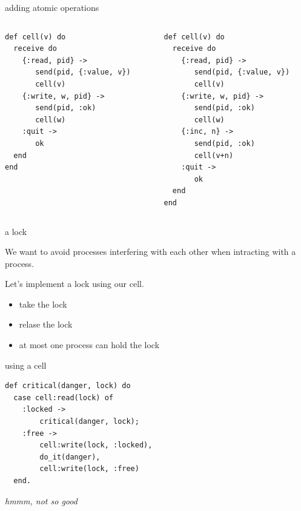 \begin{frame}[fragile]{adding atomic operations}

\begin{columns}
 \begin{column}{0.5\linewidth}
\begin{verbatim}
def cell(v) do
  receive do
    {:read, pid} ->
       send(pid, {:value, v})
       cell(v)
    {:write, w, pid} ->
       send(pid, :ok)
       cell(w)
    :quit ->
       ok
  end
end
\end{verbatim}
 \end{column}
\pause
 \begin{column}{0.5\linewidth}
\begin{verbatim}
def cell(v) do
  receive do
    {:read, pid} ->
       send(pid, {:value, v})
       cell(v)
    {:write, w, pid} ->
       send(pid, :ok)
       cell(w)
    {:inc, n} ->
       send(pid, :ok)
       cell(v+n)       
    :quit ->
       ok
  end
end
\end{verbatim}
 \end{column}
\end{columns}

\end{frame}

\begin{frame}[fragile]{a lock}

\vspace{10pt}

We want to avoid processes interfering with each other when intracting
with a process.

\vspace{10pt}
Let's implement a lock using our cell.

\pause
\begin{itemize}
 \item take the lock
 \item relase the lock
 \item at most one process can hold the lock
\end{itemize}

\end{frame}


\begin{frame}[fragile]{using a cell}

\pause\vspace{20pt}

\begin{verbatim}
def critical(danger, lock) do
  case cell:read(lock) of
    :locked ->
        critical(danger, lock);
    :free ->
        cell:write(lock, :locked),
        do_it(danger),
        cell:write(lock, :free)
  end.    
\end{verbatim}

\pause\vspace{20pt}
{\em hmmm, not so good}

\end{frame}

